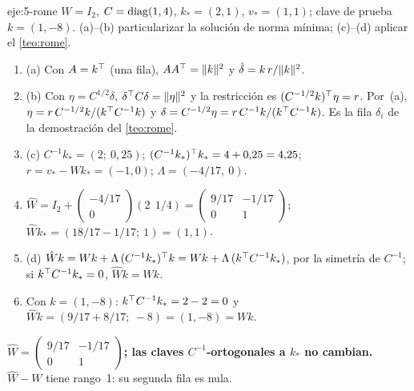 \begin{solucion}{eje:5-rome}
\datos $W=I_2$, $C=\operatorname{diag}(1,4)$, $k_*=(2,1)$, $v_*=(1,1)$; clave de prueba $k=(1,-8)$.
\planteamiento (a)--(b) particularizar la solución de norma mínima; (c)--(d) aplicar el \cref{teo:rome}.
\pasos
\begin{enumerate}[label=\arabic*.]
  \item (a) Con $A=k^{\top}$ (una fila), $AA^{\top}=\lVert k\rVert^{2}$ y $\hat\delta=k\,r/\lVert k\rVert^{2}$.
  \item (b) Con $\eta=C^{1/2}\delta$, $\delta^{\top} C\delta=\lVert\eta\rVert^{2}$ y la restricción es $(C^{-1/2}k)^{\top}\eta=r$. Por~(a), $\eta=r\,C^{-1/2}k/(k^{\top} C^{-1}k)$ y $\delta=C^{-1/2}\eta=r\,C^{-1}k/(k^{\top} C^{-1}k)$. Es la fila $\delta_i$ de la demostración del \cref{teo:rome}.
  \item (c) $C^{-1}k_*=(2;\allowbreak\ 0{,}25)$; $(C^{-1}k_*)^{\top} k_*=4+0{,}25=4{,}25$; $r=v_*-Wk_*=(-1,0)$; $\Lambda=(-4/17,\ 0)$.
  \item $\hat W=I_2+\begin{pmatrix}-4/17\\0\end{pmatrix}(2\ \ 1/4)=\begin{pmatrix}9/17&-1/17\\0&1\end{pmatrix}$; $\hat Wk_*=(18/17-1/17;\allowbreak\ 1)=(1,1)$.
  \item (d) $\hat Wk=Wk+\Lambda\,(C^{-1}k_*)^{\top} k=Wk+\Lambda\,(k^{\top} C^{-1}k_*)$, por la simetría de $C^{-1}$; si $k^{\top} C^{-1}k_*=0$, $\hat Wk=Wk$.
  \item Con $k=(1,-8)$: $k^{\top} C^{-1}k_*=2-2=0$ y $\hat Wk=(9/17+8/17;\allowbreak\ -8)=(1,-8)=Wk$.
\end{enumerate}
\resultado \textbf{$\hat W=\begin{pmatrix}9/17&-1/17\\0&1\end{pmatrix}$; las claves $C^{-1}$-ortogonales a $k_*$ no cambian.}
\comprobacion $\hat W-W$ tiene rango~1: su segunda fila es nula.
\end{solucion}

